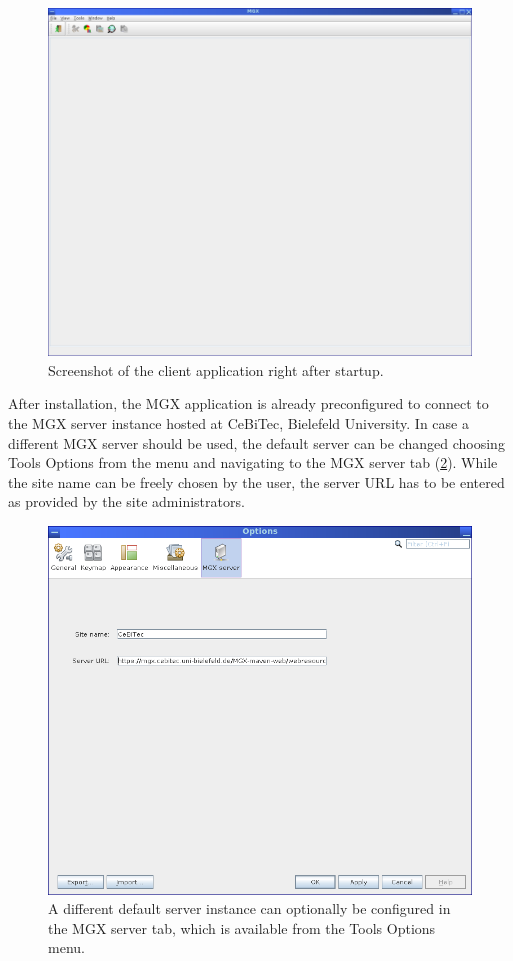 \begin{figure}[ht]
\centering
\includegraphics[width=.8\textwidth]{img/mgx/startup}
\caption[MGX client]{Screenshot of the client application right after startup.}
\label{startup}
\end{figure}

After installation, the MGX application is already preconfigured to connect to the 
MGX server instance hosted at CeBiTec, Bielefeld University. In case a different MGX server
should be used, the default server can be changed choosing Tools \textrightarrow Options from the menu
and navigating to the MGX server tab (\ref{config-site}). While the site name can be freely
chosen by the user, the server URL has to be entered as provided by the site administrators.

\begin{figure}[ht]
\centering
\includegraphics[width=.8\textwidth]{img/mgx/config-site}
\caption[Server configuration]{A different default server instance can optionally be configured in the MGX 
server tab, which is available from the Tools \textrightarrow Options menu.}
\label{config-site}
\end{figure}



